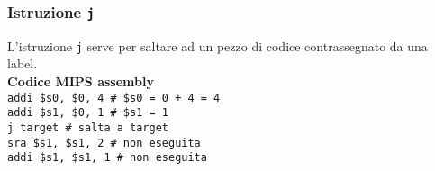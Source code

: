 \documentclass[../main.tex]{subfiles}
\begin{document}
\subsubsection{Istruzione \texttt{j}}
L'istruzione \texttt{j} serve per saltare ad un pezzo di codice
contrassegnato da una label.
\\[2mm]
\textbf{Codice MIPS assembly} \\
\texttt{addi \$s0, \$0, 4 \hspace*{0cm} \hspace*{0cm} \hspace*{0cm} \hspace*{0cm} \hspace*{0cm} \hspace*{0cm} \# \$s0 = 0 + 4 = 4} \\
\texttt{addi \$s1, \$0, 1 \hspace*{0cm} \hspace*{0cm} \hspace*{0cm} \hspace*{0cm} \hspace*{0cm} \hspace*{0cm} \# \$s1 = 1} \\
\texttt{j target \hspace*{0cm} \hspace*{0cm} \hspace*{0cm} \hspace*{0cm} \hspace*{0cm} \hspace*{0cm} \hspace*{0cm} \hspace*{0cm} \hspace*{0cm} \hspace*{0cm} \hspace*{0cm} \hspace*{0cm} \hspace*{0cm} \# salta a target} \\
\texttt{sra \$s1, \$s1, 2 \hspace*{0cm} \hspace*{0cm} \hspace*{0cm} \hspace*{0cm} \hspace*{0cm} \hspace*{0cm} \# non eseguita} \\
\texttt{addi \$s1, \$s1, 1 \hspace*{0cm} \hspace*{0cm} \hspace*{0cm} \hspace*{0cm} \hspace*{0cm} \# non eseguita} \\
\end{document}
